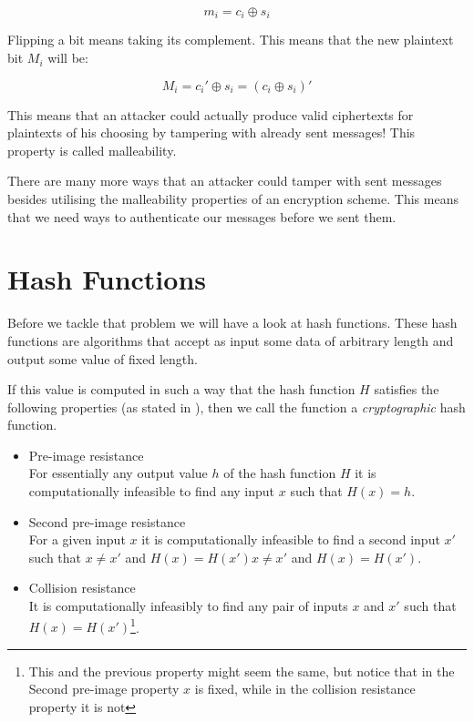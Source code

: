 \[
  m_i = c_i \oplus s_i
\]

Flipping a bit means taking its complement.
This means that the new plaintext bit $M_i$ will be:

\[
  M_i = c_i\prime \oplus s_i = (c_i \oplus s_i)\prime
\]

This means that an attacker could actually produce valid ciphertexts for plaintexts of his choosing by tampering with already sent messages!
This property is called malleability.

There are many more ways that an attacker could tamper with sent messages besides utilising the malleability properties of an encryption scheme.
This means that we need ways to authenticate our messages before we sent them.

\section{Hash Functions}

Before we tackle that problem we will have a look at hash functions.
These hash functions are algorithms that accept as input some data of arbitrary length and output some value of fixed length.

If this value is computed in such a way that the hash function $H$ satisfies the following properties (as stated in \cite{appliedcrypto}), then we call the function a \emph{cryptographic} hash function.

\begin{itemize}
  \item Pre-image resistance\\[0.2cm]
    For essentially any output value $h$ of the hash function $H$ it is computationally infeasible to find any input $x$ such that $H(x) = h$.

  \item Second pre-image resistance\\[0.2cm]
    For a given input $x$ it is computationally infeasible to find a second input $x\prime$ such that $x \ne x\prime$ and $H(x) = H(x\prime)$$x \ne x\prime$ and $H(x) = H(x\prime)$.

  \item Collision resistance\\[0.2cm]
    It is computationally infeasibly to find any pair of inputs $x$ and $x\prime$ such that $H(x) = H(x\prime)$\footnote{This and the previous property might seem the same, but notice that in the Second pre-image property $x$ is fixed, while in the collision resistance property it is not}.
\end{itemize}

